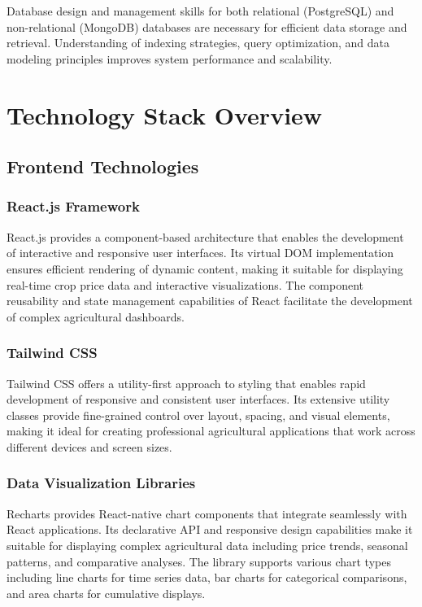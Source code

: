 Database design and management skills for both relational (PostgreSQL) and non-relational (MongoDB) databases are necessary for efficient data storage and retrieval. Understanding of indexing strategies, query optimization, and data modeling principles improves system performance and scalability.

\section{Technology Stack Overview}

\subsection{Frontend Technologies}

\subsubsection{React.js Framework}
React.js provides a component-based architecture that enables the development of interactive and responsive user interfaces. Its virtual DOM implementation ensures efficient rendering of dynamic content, making it suitable for displaying real-time crop price data and interactive visualizations. The component reusability and state management capabilities of React facilitate the development of complex agricultural dashboards.

\subsubsection{Tailwind CSS}
Tailwind CSS offers a utility-first approach to styling that enables rapid development of responsive and consistent user interfaces. Its extensive utility classes provide fine-grained control over layout, spacing, and visual elements, making it ideal for creating professional agricultural applications that work across different devices and screen sizes.

\subsubsection{Data Visualization Libraries}
Recharts provides React-native chart components that integrate seamlessly with React applications. Its declarative API and responsive design capabilities make it suitable for displaying complex agricultural data including price trends, seasonal patterns, and comparative analyses. The library supports various chart types including line charts for time series data, bar charts for categorical comparisons, and area charts for cumulative displays.

